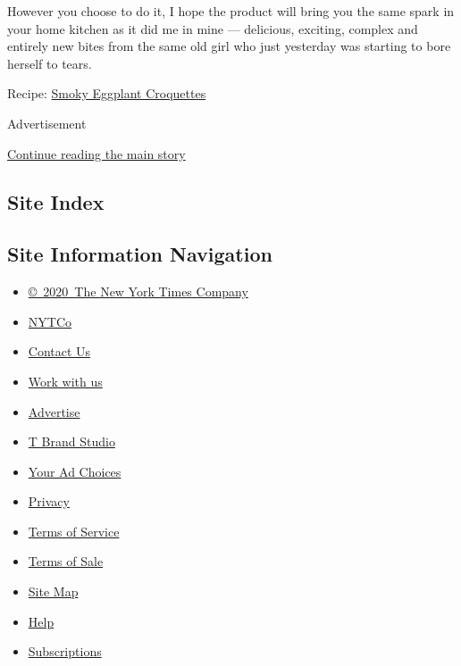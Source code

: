 However you choose to do it, I hope the product will bring you the same
spark in your home kitchen as it did me in mine --- delicious, exciting,
complex and entirely new bites from the same old girl who just yesterday
was starting to bore herself to tears.

Recipe:
\href{https://cooking.nytimes3xbfgragh.onion/recipes/1021285-smoky-eggplant-croquettes?action=click\&module=Global\%20Search\%20Recipe\%20Card\&pgType=search\&rank=2}{Smoky
Eggplant Croquettes}

Advertisement

\protect\hyperlink{after-bottom}{Continue reading the main story}

\hypertarget{site-index}{%
\subsection{Site Index}\label{site-index}}

\hypertarget{site-information-navigation}{%
\subsection{Site Information
Navigation}\label{site-information-navigation}}

\begin{itemize}
\tightlist
\item
  \href{https://help.nytimes3xbfgragh.onion/hc/en-us/articles/115014792127-Copyright-notice}{©~2020~The
  New York Times Company}
\end{itemize}

\begin{itemize}
\tightlist
\item
  \href{https://www.nytco.com/}{NYTCo}
\item
  \href{https://help.nytimes3xbfgragh.onion/hc/en-us/articles/115015385887-Contact-Us}{Contact
  Us}
\item
  \href{https://www.nytco.com/careers/}{Work with us}
\item
  \href{https://nytmediakit.com/}{Advertise}
\item
  \href{http://www.tbrandstudio.com/}{T Brand Studio}
\item
  \href{https://www.nytimes3xbfgragh.onion/privacy/cookie-policy\#how-do-i-manage-trackers}{Your
  Ad Choices}
\item
  \href{https://www.nytimes3xbfgragh.onion/privacy}{Privacy}
\item
  \href{https://help.nytimes3xbfgragh.onion/hc/en-us/articles/115014893428-Terms-of-service}{Terms
  of Service}
\item
  \href{https://help.nytimes3xbfgragh.onion/hc/en-us/articles/115014893968-Terms-of-sale}{Terms
  of Sale}
\item
  \href{https://spiderbites.nytimes3xbfgragh.onion}{Site Map}
\item
  \href{https://help.nytimes3xbfgragh.onion/hc/en-us}{Help}
\item
  \href{https://www.nytimes3xbfgragh.onion/subscription?campaignId=37WXW}{Subscriptions}
\end{itemize}
